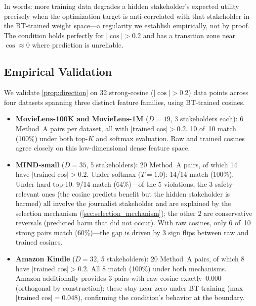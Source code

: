 \documentclass[11pt,letterpaper]{article}
\begin{document}
In words: more training data degrades a hidden stakeholder's expected
utility precisely when the optimization target is anti-correlated with
that stakeholder in the BT-trained weight space---a regularity we
establish empirically, not by proof. The condition holds
perfectly for $|\cos| > 0.2$ and has a transition zone near
$\cos \approx 0$ where prediction is unreliable.

\subsection{Empirical Validation}

We validate \cref{prop:direction} on 32 strong-cosine
($|\cos| > 0.2$) data points across four datasets spanning three
distinct feature families, using BT-trained cosines.

\begin{itemize}
  \item \textbf{MovieLens-100K and MovieLens-1M} ($D{=}19$,
    3 stakeholders each): 6 Method~A pairs per dataset, all with
    $|\text{trained~cos}| > 0.2$. 10 of~10 match (100\%) under both
    top-$K$ and softmax evaluation. Raw and trained cosines agree
    closely on this low-dimensional dense feature space.

  \item \textbf{MIND-small} ($D{=}35$, 5 stakeholders): 20 Method~A
    pairs, of which 14 have $|\text{trained~cos}| > 0.2$. Under
    softmax ($T{=}1.0$): 14/14 match (100\%). Under hard top-10:
    9/14 match (64\%)---of the 5 violations, the 3 safety-relevant ones
    (the cosine predicts benefit but the hidden stakeholder is harmed)
    all involve the journalist stakeholder and are explained by the
    selection mechanism (\cref{sec:selection_mechanism}); the other 2
    are conservative reversals (predicted harm that did not occur).
    With raw cosines, only 6 of~10
    strong pairs match (60\%)---the gap is driven by 3 sign flips
    between raw and trained cosines.

  \item \textbf{Amazon Kindle} ($D{=}32$, 5 stakeholders): 20 Method~A
    pairs, of which 8 have $|\text{trained~cos}| > 0.2$. All 8 match
    (100\%) under both mechanisms. Amazon additionally provides
    3 pairs with raw cosine exactly~$0.000$ (orthogonal by
    construction); these stay near zero under BT training
    (max $|\text{trained cos}| = 0.048$), confirming the condition's
    behavior at the boundary.
\end{itemize}
\end{document}
